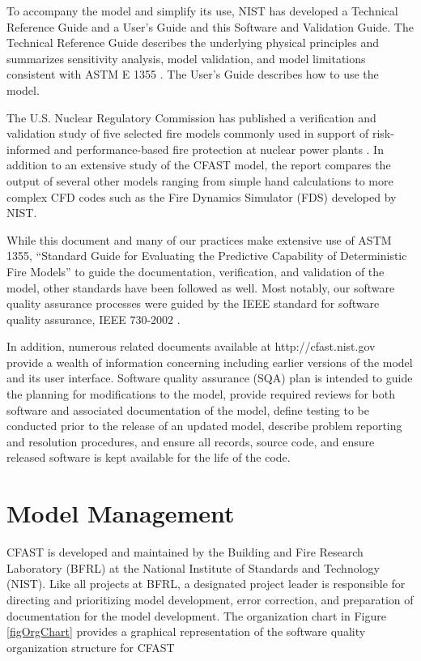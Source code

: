 To accompany the model and simplify its use, NIST has developed a Technical Reference Guide \cite{CFAST_Tech_Guide_6} and a User's Guide \cite{CFAST_Users_Guide_6} and this Software and Validation Guide.  The Technical Reference Guide describes the underlying physical principles and summarizes sensitivity analysis, model validation, and model limitations consistent with ASTM E 1355 \cite{ASTM:E1355}.  The User's Guide describes how to use the model.  

The U.S. Nuclear Regulatory Commission has published a verification and validation study of five selected fire models commonly used in support of risk-informed and performance-based fire protection at nuclear power plants \cite{NRCNUREG1824}. In addition to an extensive study of the CFAST model, the report compares the output of several other models ranging from simple hand calculations to more complex CFD codes such as the Fire Dynamics Simulator (FDS) developed by NIST.

While this document and many of our practices make extensive use of ASTM 1355, ``Standard Guide for Evaluating the Predictive Capability of Deterministic Fire Models'' \cite{ASTM:E1355} to guide the documentation, verification, and validation of the model, other standards have been followed as well.  Most notably, our software quality assurance processes were guided by the IEEE standard for software quality assurance, IEEE 730-2002 \cite{IEEE:730}.

In addition, numerous related documents available at http://cfast.nist.gov provide a wealth of information concerning including earlier versions of the model and its user interface. Software quality assurance (SQA) plan is intended to guide the planning for modifications to the model, provide required reviews for both software and associated documentation of the model, define testing to be conducted prior to the release of an updated model, describe problem reporting and resolution procedures, and ensure all records, source code, and ensure released software is kept available for the life of the code.  

\section{Model Management}

CFAST is developed and maintained by the Building and Fire Research Laboratory (BFRL) at the National Institute of Standards and Technology (NIST). Like all projects at BFRL, a designated project leader is responsible for directing and prioritizing model development, error correction, and preparation of documentation for the model development.  The organization chart in Figure \ref{figOrgChart} provides a graphical representation of the software quality organization structure for CFAST

